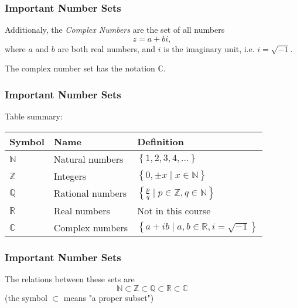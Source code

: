 \begin{frame}
  \frametitle{Important Number Sets}
  Additionaly, the \emph{Complex Numbers} are the set of all numbers
  \begin{equation*}
    z=a+bi,
  \end{equation*}
  where $a$ and $b$ are both real numbers, and $i$ is the imaginary unit, i.e. $i=\sqrt{-1}$.

  The complex number set has the notation $\mathbb{C}$.
\end{frame}

\begin{frame}
  \frametitle{Important Number Sets}
  Table summary:

  \begin{tabular}{lll}
    \toprule
    Symbol & Name & Definition \\
    \midrule
    $\mathbb{N}$ & Natural numbers & $\left\{1,2,3,4,\dots\right\}$\\
    $\mathbb{Z}$ & Integers & $\left\{ 0,\pm x \mid x\in\mathbb{N} \right\}$\\
    $\mathbb{Q}$ & Rational numbers & $\left\{ \frac{p}{q} \mid p\in\mathbb{Z}, q\in\mathbb{N} \right\}$\\
    $\mathbb{R}$ & Real numbers & Not in this course \\
    $\mathbb{C}$ & Complex numbers & $\left\{ a+ib \mid a,b\in\mathbb{R}, i=\sqrt{-1} \right\}$\\
    \midrule
  \end{tabular}
\end{frame}

\begin{frame}
  \frametitle{Important Number Sets}
  \begin{presentation_note}
    The relations between these sets are
    \begin{equation*}
      \mathbb{N}\subset \mathbb{Z}\subset\mathbb{Q}\subset\mathbb{R}\subset\mathbb{C}
    \end{equation*}
    (the symbol $\subset$ means "a proper subset")
  \end{presentation_note}
\end{frame}


